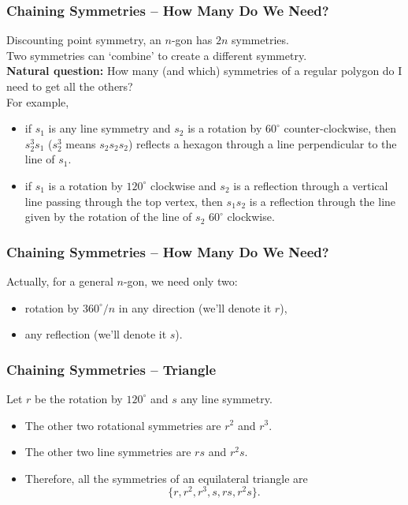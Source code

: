 \documentclass[aspectratio=169,11pt,svgnames,draft]{beamer}
\begin{document}
\begin{frame}
 \frametitle{Chaining Symmetries -- How Many Do We Need?}
 Discounting point symmetry, an $n$-gon has \alert{$2n$} symmetries.\\
 \pause
 Two symmetries can `combine' to create a different symmetry.\\
 \pause
 \textbf{Natural question:} How many (and which) symmetries of a regular polygon
  do I need to get all the others?\\
  \pause
  For example,
  \begin{itemize}[label=\textbullet,topsep=0pt]
   \item if $s_1$ is any line symmetry and $s_2$ is a rotation by $60^{ \circ }$
    counter-clockwise, then $s_2^3s_1$ ($s_2^3$ means $s_2s_2s_2$) reflects a
    hexagon through a line perpendicular to the line of $s_1$.
   \pause
   \item if $s_1$ is a rotation by $120^{ \circ }$ clockwise and $s_2$ is a
    reflection through a vertical line passing through the top vertex, then
    $s_1s_2$ is a reflection through the line given by the rotation of the line
    of $s_2$ $60^{ \circ }$ clockwise.
  \end{itemize}
\end{frame}

\begin{frame}
 \frametitle{Chaining Symmetries -- How Many Do We Need?}
 Actually, for a general $n$-gon, we need only \alert{two}:
 \pause
 \begin{itemize}[label=\textbullet,topsep=0pt]
  \item rotation by $360^{ \circ } / n$ in any direction (we'll denote it $r$),
  \pause
  \item any reflection (we'll denote it $s$).
 \end{itemize}
\end{frame}

\begin{frame}
 \frametitle{Chaining Symmetries -- Triangle}
 Let $r$ be the rotation by $120^{ \circ }$ and $s$ any line symmetry.\\
 \pause
 \begin{itemize}[label=\textbullet]
  \item The other two rotational symmetries are $r^2$ and $r^3$.
  \pause
  \item The other two line symmetries are $rs$ and $r^2s$.
  \pause
  \item Therefore, all the symmetries of an equilateral triangle are
  \[
   \{r,r^2,r^3,s,rs,r^2s\}.
  \]
 \end{itemize}
\end{frame}
\end{document}
